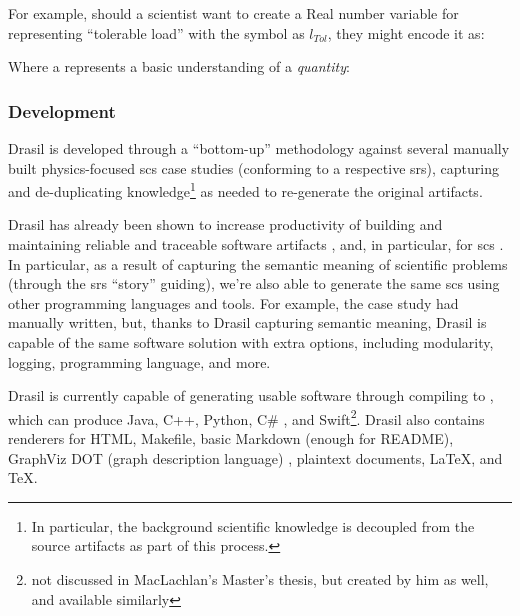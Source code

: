 For example, should a scientist want to create a Real number variable for
representing ``tolerable load'' with the symbol as $l_{Tol}$, they might encode
it as:

\originalQuantityDictExampleHaskell{}

Where a \QuantityDict{} represents a basic understanding of a \textit{quantity}:

\originalQuantityDictHaskell{}


\subsubsection{Development}

Drasil is developed through a ``bottom-up'' methodology against several manually
built physics-focused \acs{scs} case studies (conforming to a respective
\acs{srs}), capturing and de-duplicating knowledge\footnote{In particular, the
      background scientific knowledge is decoupled from the source artifacts as part
      of this process.} as needed to re-generate the original artifacts.

\caseStudiesTable{}

Drasil has already been shown to increase productivity of building and
maintaining reliable and traceable software artifacts \cite{SzymczakEtAl2016},
and, in particular, for \acs{scs} \cite{Smith2018}. In particular, as a result
of capturing the semantic meaning of scientific problems (through the \acs{srs}
``story'' guiding), we're also able to generate the same \acs{scs} using other
programming languages and tools. For example, the  case study had
manually written, but, thanks to Drasil capturing semantic meaning, Drasil is
capable of
the same software solution with extra options, including modularity, logging,
programming language, and more.

Drasil is currently capable of generating usable software through compiling to
, which can produce Java, C++, Python, C\# \cite{MacLachlan2020}, and
Swift\footnote{not discussed in MacLachlan's Master's thesis, but created by him
      as well, and available similarly}. Drasil also contains renderers for HTML,
Makefile, basic Markdown (enough for README), GraphViz DOT (graph description
language) \cite{Gansner1993}, plaintext documents, \LaTeX{}, and
\TeX{}.

